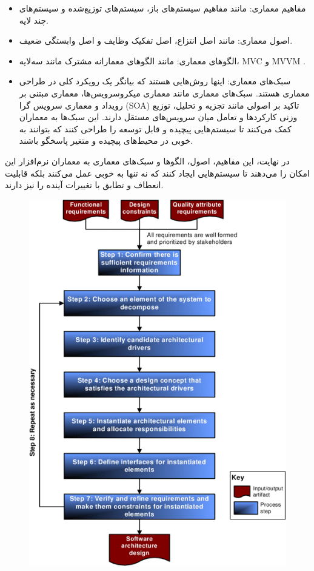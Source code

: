\begin{itemize}
	\item مفاهیم معماری: مانند مفاهیم سیستم‌های باز، سیستم‌های توزیع‌شده و سیستم‌های چند لایه.
	
	\item اصول معماری:
	 مانند اصل انتزاع، اصل تفکیک وظایف و اصل وابستگی ضعیف.
	
	\item الگوهای معماری:
	 مانند الگوهای معمارانه مشترک مانند سه‌لایه، MVC و MVVM .
	 
	 \item سبک‌های معماری: اینها روش‌هایی هستند که بیانگر یک رویکرد کلی در طراحی معماری هستند. سبک‌های معماری مانند معماری میکروسرویس‌ها، معماری مبتنی بر رویداد و معماری سرویس گرا (SOA) تاکید بر اصولی مانند تجزیه و تحلیل، توزیع وزنی کارکردها و تعامل میان سرویس‌های مستقل دارند. این سبک‌ها به معماران کمک می‌کنند تا سیستم‌هایی پیچیده و قابل توسعه را طراحی کنند که بتوانند به خوبی در محیط‌های پیچیده و متغیر پاسخگو باشند.
	 
\end{itemize}
	 
در نهایت، این مفاهیم، اصول، الگوها و سبک‌های معماری به معماران نرم‌افزار این امکان را می‌دهند تا سیستم‌هایی ایجاد کنند که نه تنها به خوبی عمل می‌کنند بلکه قابلیت انعطاف و تطابق با تغییرات آینده را نیز دارند.

\begin{figure}[H]
	\centering
	\includegraphics{pic11.png}
	\label{fig:label4}
\end{figure}